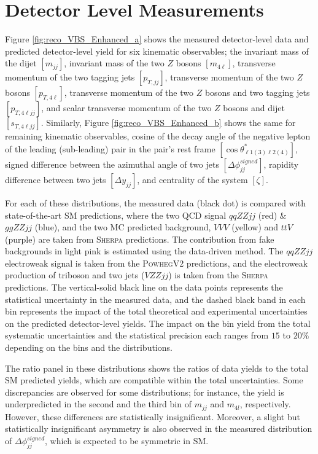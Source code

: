 \section{ Detector Level Measurements }
\label{sec:DetectorLevel_Measurement}

Figure \ref{fig:reco_VBS_Enhanced_a} shows the measured detector-level data and predicted detector-level yield for six kinematic observables; the invariant mass of the dijet $[m_{jj}]$, invariant mass of the two $Z$ bosons $[m_{4\ell}]$, transverse momentum of the two tagging jets $[p_{T,jj}]$, transverse momentum of the two $Z$ bosons $[p_{T,4\ell}]$, transverse momentum of the two $Z$ bosons and two tagging jets $[p_{T,4\ell jj}]$, and scalar transverse momentum of the two $Z$ bosons and dijet $[s_{T,4\ell jj}]$. Similarly, Figure \ref{fig:reco_VBS_Enhanced_b} shows the same for remaining kinematic observables, cosine of the decay angle of the negative lepton of the leading (sub-leading) pair in the pair's rest frame $[\cos \theta^{*}_{\ell 1 (3) \ell 2 (4)}]$, signed difference between the azimuthal angle of two jets $[\Delta \phi _{jj}^{signed}]$, rapidity difference between two jets $[\Delta y_{jj}]$, and centrality of the system $[\zeta]$.

For each of these distributions, the measured data (black dot) is compared with state-of-the-art SM predictions, where the two QCD signal $qqZZjj$ (red) $\&$ $ggZZjj$ (blue), and the two MC predicted background, $VVV$ (yellow) and $ttV$ (purple) are taken from \textsc{Sherpa} predictions. The contribution from fake backgrounds in light pink is estimated using the data-driven method. The $qqZZjj$ electroweak signal is taken from the \textsc{PowhegV2} predictions, and the electroweak production of triboson and two jets ($VZZjj$) is taken from the \textsc{Sherpa} predictions. The vertical-solid black line on the data points represents the statistical uncertainty in the measured data, and the dashed black band in each bin represents the impact of the total theoretical and experimental uncertainties on the predicted detector-level yields. The impact on the bin yield from the total systematic uncertainties and the statistical precision each ranges from $15$ to $20\%$ depending on the bins and the distributions. 

The ratio panel in these distributions shows the ratios of data yields to the total SM predicted yields, which are compatible within the total uncertainties. Some discrepancies are observed for some distributions; for instance, the yield is underpredicted in the second and the third bin of $m_{jj}$ and $m_{4l}$, respectively. However, these differences are statistically insignificant. Moreover, a slight but statistically insignificant asymmetry is also observed in the measured distribution of $\Delta \phi _{jj}^{signed}$, which is expected to be symmetric in SM. 


